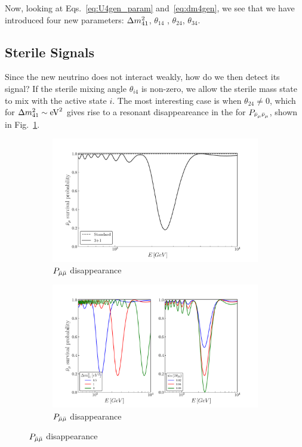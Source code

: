 Now, looking at Eqs.~\ref{eq:U4gen_param} and~\ref{eq:dm4gen}, we see that we have introduced four new parameters: $\dm[41]$, $\theta_{14}$
, $\theta_{24}$, $\theta_{34}$. 

\subsection{Sterile Signals}
Since the new neutrino does not interact weakly, how do we then detect its signal? If the sterile mixing angle $\theta_{i4}$ is non-zero, 
we allow the sterile mass state to mix with the active state $i$. The most interesting case is when $\theta_{24} \neq 0$, 
which for $\dm[41] \sim \si{\eV \squared}$ gives rise to a resonant disappeareance in the for $P_{\bar{\nu}_\mu\bar{\nu}_\mu}$, shown in Fig.~\ref{fig:sterile_resonance}.

\begin{figure}
    \centering
    \begin{subfigure}{0.45\textwidth}
        \includegraphics[width=1\linewidth]{figures/sterile_resonance.pdf}
        \caption{$P_{\bar{\mu} \bar{\mu}}$ disappearance}\label{fig:sterile_resonance}
    \end{subfigure}
    \begin{subfigure}{0.45\textwidth}
        \includegraphics[width=1\linewidth]{figures/resonance_shift.pdf}
        \caption{$P_{\bar{\mu} \bar{\mu}}$ disappearance}\label{fig:resonance_shift}
    \end{subfigure}
\end{figure} %

